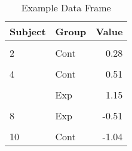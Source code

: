 \begin{table}[!h]
\centering
\begin{tabular}{llr}
\toprule
Subject & Group & Value\\
\midrule
\cellcolor{gray!10}{1} & \cellcolor{gray!10}{Exp} & \cellcolor{gray!10}{-0.36}\\
2 & Cont & 0.28\\
\cellcolor{gray!10}{3} & \cellcolor{gray!10}{Exp} & \cellcolor{gray!10}{1.54}\\
4 & Cont & 0.51\\
\cellcolor{gray!10}{5} & \cellcolor{gray!10}{Exp} & \cellcolor{gray!10}{-1.28}\\
\addlinespace
6 & Exp & 1.15\\
\cellcolor{gray!10}{7} & \cellcolor{gray!10}{Cont} & \cellcolor{gray!10}{3.78}\\
8 & Exp & -0.51\\
\cellcolor{gray!10}{9} & \cellcolor{gray!10}{Cont} & \cellcolor{gray!10}{NA}\\
10 & Cont & -1.04\\
\bottomrule
\end{tabular}
\caption{Example Data Frame}
\label{tab:data_frame_ex}
\end{table}